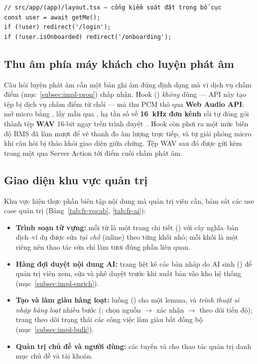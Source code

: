 \begin{verbatim}
// src/app/(app)/layout.tsx — cổng kiểm soát đặt trong bố cục
const user = await getMe();
if (!user) redirect('/login');
if (!user.isOnboarded) redirect('/onboarding');
\end{verbatim}

\subsection{Thu âm phía máy khách cho luyện phát âm}
\label{subsec:fe-audio}

Câu hỏi luyện phát âm cần một bản ghi âm đúng định dạng mà vi dịch vụ chấm điểm
(mục~\ref{subsec:impl-pron}) chấp nhận. Hook 
() \textit{không} dùng  ---
API này tạo tệp  bị dịch vụ chấm điểm từ chối --- mà thu PCM thô
qua \textbf{Web Audio API}: mở micro bằng , lấy mẫu qua
, hạ tần số về \textbf{16~kHz đơn kênh} rồi tự đóng gói thành
tệp \textbf{WAV} 16-bit ngay trên trình duyệt~\cite{w3cwebaudio, w3cmediacapture}.
Hook còn phơi ra một mức biên độ RMS đã làm mượt để vẽ thanh đo âm lượng trực
tiếp, và tự giải phóng micro khi câu hỏi bị tháo khỏi giao diện giữa chừng. Tệp
WAV sau đó được gửi kèm trong một  qua Server Action tới điểm cuối
chấm phát âm.

\subsection{Giao diện khu vực quản trị}
\label{subsec:fe-admin}

Khu vực  hiện thực phần biên tập nội dung mà quản trị viên cần,
bám sát các use case quản trị (Bảng~\ref{tab:fr-vocab}, \ref{tab:fr-ai}):

\begin{itemize}
  \item \textbf{Trình soạn từ vựng:} mỗi từ là một trang chi tiết
        () với cây nghĩa--bản dịch--ví dụ được sửa
        \textit{tại chỗ} (inline) theo từng khối nhỏ; mỗi khối là một
         riêng nên thao tác sửa chỉ làm tươi đúng phần liên quan.
  \item \textbf{Hàng đợi duyệt nội dung AI:} trang 
        liệt kê các bản nháp do AI sinh () để quản trị
        viên xem, sửa và phê duyệt trước khi xuất bản vào kho hệ thống
        (mục~\ref{subsec:impl-enrich}).
  \item \textbf{Tạo và làm giàu hàng loạt:} luồng  ()
        cho một lemma, và \textit{trình thuật sĩ nhập hàng loạt} nhiều bước
        (: chọn nguồn $\rightarrow$ xác nhận $\rightarrow$ theo dõi
        tiến độ); trang  theo dõi trạng thái các công việc làm giàu
        bất đồng bộ (mục~\ref{subsec:impl-bulk}).
  \item \textbf{Quản trị chủ đề và người dùng:} các tuyến 
        và  cho thao tác quản trị danh mục chủ đề và tài khoản.
\end{itemize}

